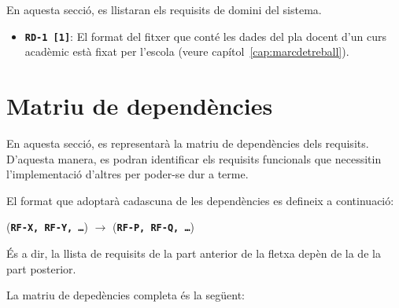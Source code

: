 \documentclass[a4paper,12pt]{ThesisStyle}
\begin{document}
En aquesta secció, es llistaran els requisits de domini del sistema.

\begin{itemize}
  \item \texttt{\textbf{RD-1 [1]}}: El format del fitxer que conté les dades del pla docent d'un curs acadèmic està fixat per l'escola (veure capítol~\ref{cap:marcdetreball}).
\end{itemize}

\section{Matriu de dependències}
\label{sec:matriu_dependencies}

En aquesta secció, es representarà la matriu de dependències dels requisits. D'aquesta manera, es podran identificar els requisits funcionals que necessitin l'implementació d'altres per poder-se dur a terme.

El format que adoptarà cadascuna de les dependències es defineix a continuació:
\\[8pt]
\centerline{(\texttt{\textbf{RF-X, RF-Y, \ldots}}) \hspace{1pt} $\longrightarrow$ \hspace{1pt} (\texttt{\textbf{RF-P, RF-Q, \ldots}})}

És a dir, la llista de requisits de la part anterior de la fletxa depèn de la de la part posterior.

La matriu de depedències completa és la següent:
\end{document}
